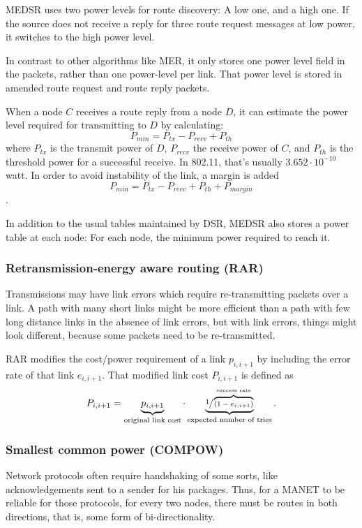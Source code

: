 MEDSR uses two power levels for route discovery: A low one, and a high one. If
the source does not receive a reply for three route request messages at low
power, it switches to the high power level.

In contrast to other algorithms like MER, it only stores one power level field
in the packets, rather than one power-level per link. That power level is stored
in amended route request and route reply packets.

When a node $C$ receives a route reply from a node $D$, it can estimate the
power level required for transmitting to $D$ by calculating:
\[ P_{min} = P_{tx} - P_{recv} + P_{th} \]
where $P_{tx}$ is the transmit power of $D$, $P_{recv}$ the receive power of $C$,
and $P_{th}$ is the threshold power for a successful receive. In 802.11, that's
usually $3.652 \cdot 10^{-10}$ watt. In order to avoid instability of the link, a margin is added
\[ P_{min} = P_{tx} - P_{recv} + P_{th} + P_{margin}\].{}

In addition to the usual tables maintained by DSR, MEDSR also stores a power
table at each node: For each node, the minimum power required to reach it.

\subsubsection{Retransmission-energy aware routing (RAR)}
Transmissions may have link errors which require re-transmitting packets over
a link. A path with many short links might be more efficient than a path with
few long distance links in the absence of link errors, but with link errors,
things might look different, because some packets need to be re-transmitted.

RAR\cite{banerjee2002minimum} modifies the cost/power requirement of a link $p_{i,i+1}$ by including the error rate of that
link $e_{i,i+1}$. That modified link cost $P_{i,i+1}$ is defined as
\[ P_{i,i+1} = \underbrace{p_{i,i+1}}_{\text{original link cost}} \cdot \underbrace{\sfrac{1}{\overbrace{(1-e_{i,i+1})}^{\text{success rate}}}}_{\text{expected number of tries}}. \]

\subsubsection{Smallest common power (COMPOW)}
Network protocols often require handshaking of some sorts, like acknowledgements
sent to a sender for his packages. Thus, for a MANET to be reliable for those
protocols, for every two nodes, there must be routes in both directions, that
is, some form of bi-directionality.

